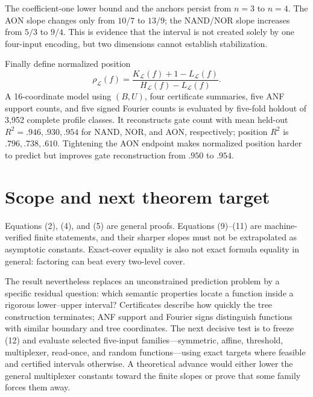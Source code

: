 \documentclass[10pt]{article}
\begin{document}
The coefficient-one lower bound and the anchors persist from $n=3$ to $n=4$.
The AON slope changes only from $10/7$ to $13/9$; the NAND/NOR slope increases
from $5/3$ to $9/4$.  This is evidence that the interval is not created solely
by one four-input encoding, but two dimensions cannot establish stabilization.

Finally define normalized position
\begin{equation}
 \rho_{\mathcal L}(f)=
 \frac{K_{\mathcal L}(f)+1-L_{\mathcal L}(f)}
 {H_{\mathcal L}(f)-L_{\mathcal L}(f)}.
\end{equation}
A 16-coordinate model using $(B,U)$, four certificate summaries, five ANF
support counts, and five signed Fourier counts is evaluated by five-fold
holdout of 3,952 complete profile classes.  It reconstructs gate count with
mean held-out $R^2=.946,.930,.954$ for NAND, NOR, and AON, respectively;
position $R^2$ is $.796,.738,.610$.  Tightening the AON endpoint makes
normalized position harder to predict but improves gate reconstruction from
$.950$ to $.954$.

\section{Scope and next theorem target}

Equations (2), (4), and (5) are general proofs.  Equations (9)--(11) are
machine-verified finite statements, and their sharper slopes must not be
extrapolated as asymptotic constants.  Exact-cover equality is also not exact
formula equality in general: factoring can beat every two-level cover.

The result nevertheless replaces an unconstrained prediction problem by a
specific residual question: which semantic properties locate a function
inside a rigorous lower--upper interval?  Certificates describe how quickly
the tree construction terminates; ANF support and Fourier signs distinguish
functions with similar boundary and tree coordinates.  The next decisive
test is to freeze (12) and evaluate selected five-input families---symmetric,
affine, threshold, multiplexer, read-once, and random functions---using exact
targets where feasible and certified intervals otherwise.  A theoretical
advance would either lower the general multiplexer constants toward the
finite slopes or prove that some family forces them away.
\end{document}
